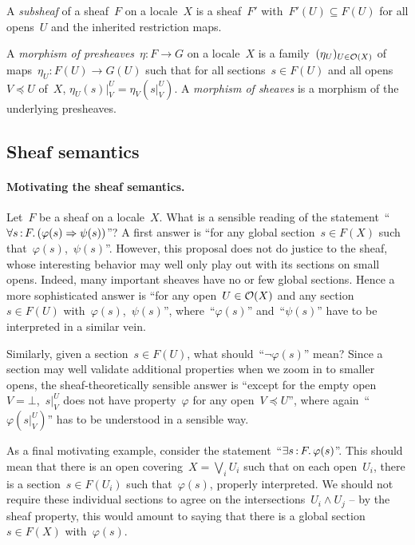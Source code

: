 \documentclass{ws-rv9x6}
\begin{document}
{\begin{definition}A \emph{subsheaf} of a sheaf~$F$ on a locale~$X$ is a
sheaf~$F'$ with~$F'(U) \subseteq F(U)$ for all opens~$U$ and the inherited
restriction maps.\end{definition}

\begin{definition}A \emph{morphism of presheaves}~$\eta : F \to G$ on a
locale~$X$ is a family~$(\eta_U)_{U \in \mathcal{O}(X)}$ of maps~$\eta_U : F(U) \to
G(U)$ such that for all sections~$s \in F(U)$ and all opens~$V \preceq U$
of~$X$, $\eta_U(s)|^U_V = \eta_V(s|^U_V)$. A \emph{morphism of sheaves} is a
morphism of the underlying presheaves.
\end{definition}


\subsection{Sheaf semantics}
\label{sect:sheaf-semantics}

\paragraph{Motivating the sheaf semantics.} Let~$F$ be a sheaf on a locale~$X$.
What is a sensible reading of the statement~``$\forall s\,{:}\,F\mathpunct{.} (\varphi(s)
\Rightarrow \psi(s))$''? A first answer is ``for any global section~$s \in
F(X)$ such that~$\varphi(s)$,~$\psi(s)$''. However, this proposal does not do
justice to the sheaf, whose interesting behavior may well only play out with
its sections on small opens. Indeed, many important sheaves have no or few
global sections. Hence a more sophisticated answer is ``for any open~$U \in
\mathcal{O}(X)$ and any section~$s \in F(U)$ with~$\varphi(s)$,~$\psi(s)$'',
where~``$\varphi(s)$'' and~``$\psi(s)$'' have to be interpreted in a similar
vein.

Similarly, given a section~$s \in F(U)$, what should~``$\neg\varphi(s)$'' mean?
Since a section may well validate additional properties when we zoom in to
smaller opens, the sheaf-theoretically sensible answer is ``except for the
empty open~$V = \bot$,~$s|^U_V$ does not have property~$\varphi$ for any
open~$V \preceq U$'', where again~``$\varphi(s|^U_V)$'' has to be understood in a
sensible way.

As a final motivating example, consider the statement~``$\exists s\,{:}\,F\mathpunct{.}
\varphi(s)$''. This should mean that there is an open covering~$X = \bigvee_i
U_i$ such that on each open~$U_i$, there is a section~$s \in F(U_i)$ such
that~$\varphi(s)$, properly interpreted. We should not require these individual
sections to agree on the intersections~$U_i \wedge U_j$ -- by the sheaf
property, this would amount to saying that there is a global section~$s \in
F(X)$ with~$\varphi(s)$.

}
\end{document}
